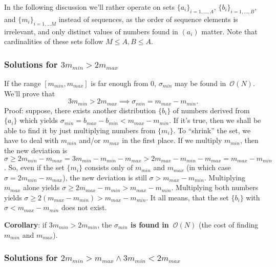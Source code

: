 \documentclass[paper=a4,parskip=half,DIV=12]{leetcode}
\begin{document}
In the following discussion we'll rather operate on sets $\{ a_i \}_{i =
1,\dots, A}$, $\{ b_i \}_{i = 1, \dots, B}$, and $\{ m_i \}_{i = 1, \dots M}$
instead of sequences, as the order of sequence elements is irrelevant, and only
distinct values of numbers found in $(a_i)$ matter. Note that cardinalities of
these sets follow $M \le A, B \le A$.

\subsubsection{Solutions for $3 m_{min} > 2 m_{max}$}
\label{sec:ZCP3Z}

If the range $[m_{min}, m_{max}]$ is far enough from $0$, $\sigma_{min}$ may be
found in~$\mathcal{O}(N)$. We'll prove that
\begin{equation}
  3 m_{min} > 2 m_{max} \implies \sigma_{min} = m_{max} - m_{min}.
  \label{eq:FX72R}
\end{equation}
Proof: suppose, there exists another distribution $\{b_i\}$ of numbers derived
from $\{a_i\}$ which yields $\sigma_{min} = b_{max} - b_{min} < m_{max} -
m_{min}$. If it's true, then we shall be able to find it by just multiplying
numbers from $\{m_i\}$. To ``shrink'' the set, we have to deal with $m_{min}$
and/or $m_{max}$ in the first place. If we multiply $m_{min}$, then the new
deviation is $\sigma \ge 2 m_{min} - m_{max} = 3 m_{min} - m_{min} - m_{max} > 2
m_{max} - m_{min} - m_{max} = m_{max} - m_{min}$. So, even if the set $\{m_i\}$
consists only of $m_{min}$ and $m_{max}$ (in which case $\sigma = 2 m_{min} -
m_{max}$), the new deviation is still $\sigma > m_{max} - m_{min}$. Multiplying
$m_{max}$ alone yields $\sigma \ge 2 m_{max} - m_{min} > m_{max} - m_{min}$.
Multiplying both numbers yields $\sigma \ge 2 (m_{max} - m_{min}) > m_{max} -
m_{min}$. It all means, that the set $\{b_i\}$ with $\sigma < m_{max} - m_{min}$
does not exist.

\textbf{Corollary}: if $3 m_{min} > 2 m_{min}$, the \textbf{$\sigma_{min}$ is
found in~$\mathcal{O}(N)$} (the cost of finding $m_{min}$ and $m_{max}$).

\subsubsection{Solutions for $2 m_{min} > m_{max} \wedge 3 m_{min} < 2 m_{max}$}
\label{sec:6GNBB}
\end{document}
